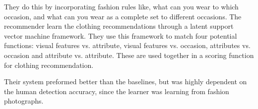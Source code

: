     They do this by incorporating fashion rules like, what can you wear to which occasion, and what can you wear as a complete set to different occasions.
    The recommender learn the clothing recommendations through a latent support vector machine framework.
    They use this framework to match four potential functions: visual features vs. attribute, visual features vs. occasion, attributes vs. occasion and attribute vs. attribute.
    These are used together in a scoring function for clothing recommendation.

    Their system preformed better than the baselines, but was highly dependent on the human detection accuracy, since the learner was learning from fashion photographs.
